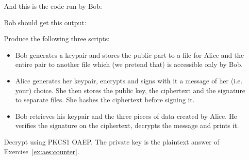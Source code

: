 \documentclass[a4paper,11pt]{article}
\begin{document}
    And this is the code run by Bob:

    \codelisting{\pssusagebob}

    Bob should get this output:
    \outputlisting{\pssusagebob}

    \begin{exercise}
      Produce the following three scripts:
      \begin{itemize}
        \item Bob generates a keypair and stores the public part to a file for
        Alice and the entire pair to another file which (we pretend that) is
        accessible only by Bob.
        \item Alice generates her keypair, encrypts and signs with it a message
        of her (i.e. your) choice. She then stores the public key, the
        ciphertext and the signature to separate files. She hashes the
        ciphertext before signing it.
        \item Bob retrieves his keypair and the three pieces of data created by
        Alice. He verifies the signature on the ciphertext, decrypts the
        message and prints it.
      \end{itemize}
    \end{exercise}


    \begin{exercise*}
      Decrypt \topythonbytes{\quotecipher} using PKCS1 OAEP. The private key is
      the plaintext answer of Exercise~\ref{ex:aes:counter}.
    \end{exercise*}

\end{document}
